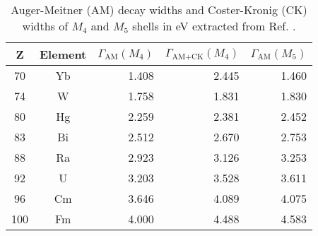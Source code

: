 \begin{table*}[ht]
 \caption{Auger-Meitner (AM) decay widths and Coster-Kronig (CK) widths
          of $M_4$ and $M_5$ shells
          in \unit{eV} extracted from
          Ref. \cite{Chen80}.}
 \begin{tabular}{ccrrr}
 \toprule
 Z & Element & $\Gamma_\text{AM}(M_4)$ & $\Gamma_\text{AM+CK}(M_4)$ & $\Gamma_\text{AM}(M_5)$\\
 \midrule
 70 & Yb & 1.408 & 2.445 & 1.460 \\
 74 & W  & 1.758 & 1.831 & 1.830 \\
 80 & Hg & 2.259 & 2.381 & 2.452 \\
 83 & Bi & 2.512 & 2.670 & 2.753 \\
 88 & Ra & 2.923 & 3.126 & 3.253 \\
 92 & U  & 3.203 & 3.528 & 3.611 \\
 96 & Cm & 3.646 & 4.089 & 4.075 \\
100 & Fm & 4.000 & 4.488 & 4.583 \\
 \bottomrule
 \end{tabular}
 \label{tab:M45}
\end{table*}
